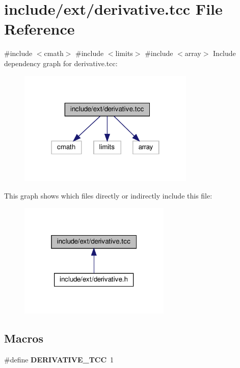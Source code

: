\hypertarget{derivative_8tcc}{}\section{include/ext/derivative.tcc File Reference}
\label{derivative_8tcc}
{\ttfamily \#include $<$cmath$>$}\newline
{\ttfamily \#include $<$limits$>$}\newline
{\ttfamily \#include $<$array$>$}\newline
Include dependency graph for derivative.\+tcc\+:
\nopagebreak
\begin{figure}[H]
\begin{center}
\leavevmode
\includegraphics[width=238pt]{derivative_8tcc__incl}
\end{center}
\end{figure}
This graph shows which files directly or indirectly include this file\+:
\nopagebreak
\begin{figure}[H]
\begin{center}
\leavevmode
\includegraphics[width=205pt]{derivative_8tcc__dep__incl}
\end{center}
\end{figure}
\subsection*{Macros}
\begin{DoxyCompactItemize}
\item 
\mbox{\label{derivative_8tcc_a54af6186cc76acd0ee53592c04a3d1fd}} 
\#define {\bfseries D\+E\+R\+I\+V\+A\+T\+I\+V\+E\+\_\+\+T\+CC}~1
\end{DoxyCompactItemize}
